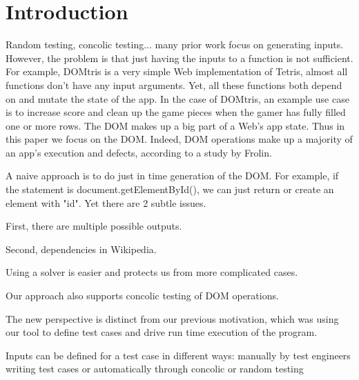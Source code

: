 \section{Introduction}
Random testing, concolic testing... many prior work focus on generating inputs. 
However, the problem is that just having the inputs to a function is not sufficient.  
For example, DOMtris is a very simple Web implementation of Tetris, almost all functions don't have any input arguments.  
Yet, all these functions both depend on and mutate the state of the app.  
In the case of DOMtris, an example use case is to increase score and clean up the game pieces when the gamer has fully filled one or more rows.  
The DOM makes up a big part of a Web's app state.  
Thus in this paper we focus on the DOM.  
Indeed, DOM operations make up a majority of an app's execution and defects, according to a study by Frolin.  

A naive approach is to do just in time generation of the DOM.  
For example, if the statement is document.getElementById(), we can just return or create an element with "id".  
Yet there are 2 subtle issues.

First, there are multiple possible outputs.  

Second, dependencies in Wikipedia.  

Using a solver is easier and protects us from more complicated cases.

Our approach also supports concolic testing of DOM operations.



The new perspective is distinct from our previous motivation, which was using our tool to define test cases and drive run time execution of the program.  

Inputs can be defined for a test case in different ways: manually by test engineers writing test cases or automatically through concolic or random testing
